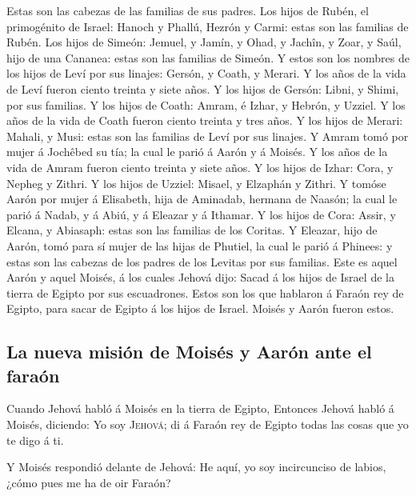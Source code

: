  Estas son las cabezas de las familias de sus padres. Los
hijos de Rubén, el primogénito de Israel: Hanoch y Phallú, Hezrón y
Carmi: estas son las familias de Rubén.  Los hijos de
Simeón: Jemuel, y Jamín, y Ohad, y Jachîn, y Zoar, y Saúl, hijo de una
Cananea: estas son las familias de Simeón.  Y estos son
los nombres de los hijos de Leví por sus linajes: Gersón, y Coath, y
Merari. Y los años de la vida de Leví fueron ciento treinta y siete
años.  Y los hijos de Gersón: Libni, y Shimi, por sus
familias.  Y los hijos de Coath: Amram, é Izhar, y
Hebrón, y Uzziel. Y los años de la vida de Coath fueron ciento treinta y
tres años.  Y los hijos de Merari: Mahali, y Musi: estas
son las familias de Leví por sus linajes.  Y Amram tomó
por mujer á Jochêbed su tía; la cual le parió á Aarón y á Moisés. Y los
años de la vida de Amram fueron ciento treinta y siete años.
 Y los hijos de Izhar: Cora, y Nepheg y Zithri.
 Y los hijos de Uzziel: Misael, y Elzaphán y Zithri.
 Y tomóse Aarón por mujer á Elisabeth, hija de Aminadab,
hermana de Naasón; la cual le parió á Nadab, y á Abiú, y á Eleazar y á
Ithamar.  Y los hijos de Cora: Assir, y Elcana, y
Abiasaph: estas son las familias de los Coritas.  Y
Eleazar, hijo de Aarón, tomó para sí mujer de las hijas de Phutiel, la
cual le parió á Phinees: y estas son las cabezas de los padres de los
Levitas por sus familias.  Este es aquel Aarón y aquel
Moisés, á los cuales Jehová dijo: Sacad á los hijos de Israel de la
tierra de Egipto por sus escuadrones.  Estos son los que
hablaron á Faraón rey de Egipto, para sacar de Egipto á los hijos de
Israel. Moisés y Aarón fueron estos.

\hypertarget{la-nueva-misiuxf3n-de-moisuxe9s-y-aaruxf3n-ante-el-farauxf3n}{%
\subsection{La nueva misión de Moisés y Aarón ante el
faraón}\label{la-nueva-misiuxf3n-de-moisuxe9s-y-aaruxf3n-ante-el-farauxf3n}}

 Cuando Jehová habló á Moisés en la tierra de Egipto,
 Entonces Jehová habló á Moisés, diciendo: Yo soy
\textsc{Jehová}; di á Faraón rey de Egipto todas las cosas que yo te
digo á ti.

 Y Moisés respondió delante de Jehová: He aquí, yo soy
incircunciso de labios, ¿cómo pues me ha de oir Faraón?

